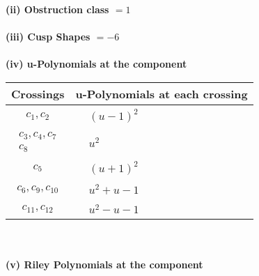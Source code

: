 \documentclass[1p]{elsarticle_modified}
\theoremstyle{definition}
\begin{document}
\flushleft \textbf{(ii) Obstruction class $= 1$}\\~\\
\flushleft \textbf{(iii) Cusp Shapes $= -6$}\\~\\
\newpage\renewcommand{\arraystretch}{1}
\flushleft \textbf{(iv) u-Polynomials at the component}\newline \\
\begin{tabular}{m{50pt}|m{274pt}}
Crossings & \hspace{64pt}u-Polynomials at each crossing \\
\hline $$\begin{aligned}c_{1},c_{2}\end{aligned}$$&$\begin{aligned}
&(u-1)^2
\end{aligned}$\\
\hline $$\begin{aligned}c_{3},c_{4},c_{7}\\c_{8}\end{aligned}$$&$\begin{aligned}
&u^2
\end{aligned}$\\
\hline $$\begin{aligned}c_{5}\end{aligned}$$&$\begin{aligned}
&(u+1)^2
\end{aligned}$\\
\hline $$\begin{aligned}c_{6},c_{9},c_{10}\end{aligned}$$&$\begin{aligned}
&u^2+u-1
\end{aligned}$\\
\hline $$\begin{aligned}c_{11},c_{12}\end{aligned}$$&$\begin{aligned}
&u^2- u-1
\end{aligned}$\\
\hline
\end{tabular}\\~\\
\newpage\renewcommand{\arraystretch}{1}
\flushleft \textbf{(v) Riley Polynomials at the component}\newline \\
\end{document}
